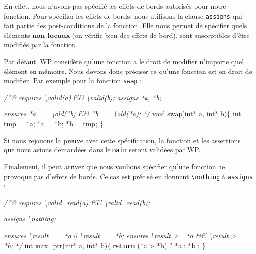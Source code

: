 \documentclass[12pt,francais,]{scrbook}
\newenvironment{Shaded}{}{}
\newcommand{\KeywordTok}[1]{\textcolor[rgb]{0.00,0.44,0.13}{\textbf{{#1}}}}
\newcommand{\DataTypeTok}[1]{\textcolor[rgb]{0.56,0.13,0.00}{{#1}}}
\newcommand{\CommentTok}[1]{\textcolor[rgb]{0.38,0.63,0.69}{\textit{{#1}}}}
\newcommand{\NormalTok}[1]{{#1}}
\begin{document}
En effet, nous n'avons pas spécifié les effets de bords autorisés pour
notre fonction. Pour spécifier les effets de bords, nous utilisons la
clause \texttt{assigns} qui fait partie des post-conditions de la
fonction. Elle nous permet de spécifier quels éléments \textbf{non
locaux} (on vérifie bien des effets de bord), sont susceptibles d'être
modifiés par la fonction.

Par défaut, WP considère qu'une fonction a le droit de modifier
n'importe quel élément en mémoire. Nous devons donc préciser ce qu'une
fonction est en droit de modifier. Par exemple pour la fonction
\texttt{swap} :

\clearpage

\begin{footnotesize}\begin{Shaded}
\begin{Highlighting}[]
\CommentTok{/*@}
\CommentTok{  requires \textbackslash{}valid(a) && \textbackslash{}valid(b);}
\CommentTok{ }
\CommentTok{  assigns *a, *b;}

\CommentTok{  ensures  *a == \textbackslash{}old(*b) && *b == \textbackslash{}old(*a);}
\CommentTok{*/}
\DataTypeTok{void} \NormalTok{swap(}\DataTypeTok{int}\NormalTok{* a, }\DataTypeTok{int}\NormalTok{* b)\{}
  \DataTypeTok{int} \NormalTok{tmp = *a;}
  \NormalTok{*a = *b;}
  \NormalTok{*b = tmp;}
\NormalTok{\}}
\end{Highlighting}
\end{Shaded}\end{footnotesize}

Si nous rejouons la preuve avec cette spécification, la fonction et les
assertions que nous avions demandées dans le \texttt{main} seront
validées par WP.

Finalement, il peut arriver que nous voulions spécifier qu'une fonction
ne provoque pas d'effets de bords. Ce cas est précisé en donnant
\texttt{\textbackslash{}nothing} à \texttt{assigns} :

\begin{footnotesize}\begin{Shaded}
\begin{Highlighting}[]
\CommentTok{/*@}
\CommentTok{  requires \textbackslash{}valid_read(a) && \textbackslash{}valid_read(b);}

\CommentTok{  assigns  \textbackslash{}nothing;}

\CommentTok{  ensures \textbackslash{}result == *a || \textbackslash{}result == *b;}
\CommentTok{  ensures \textbackslash{}result >= *a && \textbackslash{}result >= *b;}
\CommentTok{*/}
\DataTypeTok{int} \NormalTok{max_ptr(}\DataTypeTok{int}\NormalTok{* a, }\DataTypeTok{int}\NormalTok{* b)\{}
  \KeywordTok{return} \NormalTok{(*a > *b) ? *a : *b ;}
\NormalTok{\}}
\end{Highlighting}
\end{Shaded}\end{footnotesize}
\end{document}
